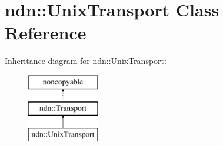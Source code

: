 \hypertarget{classndn_1_1UnixTransport}{}\section{ndn\+:\+:Unix\+Transport Class Reference}
\label{classndn_1_1UnixTransport}
Inheritance diagram for ndn\+:\+:Unix\+Transport\+:\begin{figure}[H]
\begin{center}
\leavevmode
\includegraphics[height=3.000000cm]{classndn_1_1UnixTransport}
\end{center}
\end{figure}
